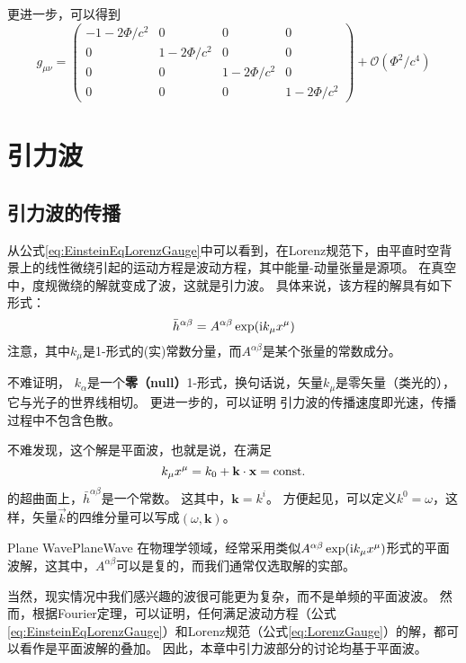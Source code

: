 更进一步，可以得到
\begin{equation}\label{eq:NewtonianMetric}
  g_{\mu\nu} ={\begin{pmatrix}
    -1-2\Phi/c^2 & 0 & 0 & 0\\
    0 & 1-2\Phi/c^2 & 0 & 0\\ 
    0 & 0 & 1-2\Phi/c^2 & 0\\
    0 & 0 & 0 & 1-2\Phi/c^2\end{pmatrix}} + \mathcal{O}(\Phi^2/c^4)
\end{equation}


\section{引力波}
\subsection{引力波的传播}
从公式\ref{eq:EinsteinEqLorenzGauge}中可以看到，在Lorenz规范下，由平直时空背景上的线性微绕引起的运动方程是波动方程，其中能量-动量张量是源项。
在真空中，度规微绕的解就变成了波，这就是引力波。
具体来说，该方程的解具有如下形式：
\begin{equation}\label{eq:GWsolution} 
  \bar{h}^{\alpha\beta} =  A^{\alpha\beta} \exp({\rm i} k_\mu x^\mu)
\end{equation}
注意，其中${k_\mu}$是1-形式的(实)常数分量，而$A^{\alpha\beta}$是某个张量的常数成分。

不难证明，%
$k_\alpha$是一个{\textbf{零（null）}}1-形式，换句话说，矢量$k_\mu$是零矢量（类光的），它与光子的世界线相切。
更进一步的，可以证明%
引力波的传播速度即光速，传播过程中不包含色散。%

不难发现，这个解是平面波，也就是说，在满足
\begin{equation}\label{eq:PlaneWave} 
  k_\mu x^\mu = k_0+\textbf{k}\cdot\textbf{x} =  {\rm const.}
\end{equation}
的超曲面上，$\bar{h}^{\alpha\beta} $是一个常数。
这其中，$\textbf{k}={k^i}$。
方便起见，可以定义$k^0=\omega$，这样，矢量$\vec{k}$的四维分量可以写成$(\omega,\textbf{k})$。
\begin{myprop}{Plane Wave}{PlaneWave}
  在物理学领域，经常采用类似$A^{\alpha\beta} \exp({\rm i} k_\mu x^\mu)$形式的平面波解，这其中，$A^{\alpha\beta}$可以是复的，而我们通常仅选取解的实部。

  当然，现实情况中我们感兴趣的波很可能更为复杂，而不是单频的平面波波。
  然而，根据Fourier定理，可以证明，任何满足波动方程（公式\ref{eq:EinsteinEqLorenzGauge}）和Lorenz规范（公式\ref{eq:LorenzGauge}）的解，都可以看作是平面波解的叠加。
  因此，本章中引力波部分的讨论均基于平面波。
\end{myprop}

